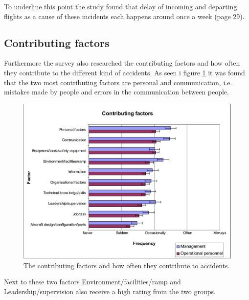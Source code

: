 To underline this point the study found that delay of incoming and departing flights as a cause of these incidents each happens around once a week (page 29).

\subsection{Contributing factors} %
Furthermore the survey also researched the contributing factors and how often they contribute to the different kind of accidents. As seen i figure \ref{ContributingFactors} it was found that the two most contributing factors are personal and communication, i.e. mistakes made by people and errors in the communication between people.

\begin{figure}[H]
\centering
\includegraphics[width=\textwidth]{Grafik/ContributingFactors}
\caption{The contributing factors and how often they contribute to accidents.}
\label{ContributingFactors}
\end{figure}

Next to these two factors Environment/facilities/ramp and Leadership/supervision also receive a high rating from the two groups. 

